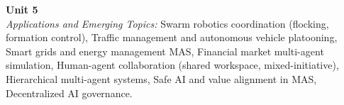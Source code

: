 \vspace{0.3cm}

\noindent\textbf{Unit 5} \\
\textit{Applications and Emerging Topics:} Swarm robotics coordination (flocking, formation control), Traffic management and autonomous vehicle platooning, Smart grids and energy management MAS, Financial market multi-agent simulation, Human-agent collaboration (shared workspace, mixed-initiative), Hierarchical multi-agent systems, Safe AI and value alignment in MAS, Decentralized AI governance.

\newpage
{}
